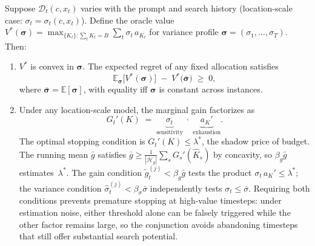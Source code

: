 \begin{proposition}
\label{prop:online}
Suppose $\mathcal{D}_t(c,x_t)$ varies with the prompt and search history
(location-scale case: $\sigma_t = \sigma_t(c,x_t)$).
Define the oracle value
$V^*(\boldsymbol{\sigma})=\max_{\{K_t\}:\sum_t K_t=B}\sum_t\sigma_t\,a_{K_t}$
for variance profile $\boldsymbol{\sigma}=(\sigma_1,\dots,\sigma_T)$.
Then:
\begin{enumerate}
\item[\textbf{(i)}]
  $V^*$ is convex in $\boldsymbol{\sigma}$.
  The expected regret of any fixed allocation satisfies
  \begin{equation}
    \mathbb{E}_{\boldsymbol{\sigma}}\!\bigl[V^*(\boldsymbol{\sigma})\bigr]
    \;-\; V^*\!\bigl(\bar{\boldsymbol{\sigma}}\bigr) \;\ge\; 0,
    \label{eq:jensen-gap}
  \end{equation}
  where $\bar{\boldsymbol{\sigma}}=\mathbb{E}[\boldsymbol{\sigma}]$,
  with equality iff $\boldsymbol{\sigma}$ is constant across instances.
\item[\textbf{(ii)}]
  Under any location-scale model, the marginal gain factorizes as
  \begin{equation}
    G_t'(K) \;=\; \underbrace{\sigma_t}_{\text{sensitivity}}
    \;\cdot\; \underbrace{a_K'}_{\text{exhaustion}}.
    \label{eq:marginal-decomp}
  \end{equation}
  The optimal stopping condition is $G_t'(K)\le\lambda^*$, the shadow
  price of budget.
  The running mean $\bar{g}$ satisfies
  $\bar{g}\ge\tfrac{1}{|\mathcal{H}_g|}\sum_s G_s'(\hat{K}_s)$
  by concavity, so $\beta_g\bar{g}$ estimates~$\lambda^*$.
  The gain condition $\widetilde{g}_t^{(j)}<\beta_g\bar{g}$ tests the
  product $\sigma_t\,a_K'\le\lambda^*$; the variance condition
  $\hat{\sigma}_t^{(j)}<\beta_\sigma\bar{\sigma}$ independently tests
  $\sigma_t\le\bar{\sigma}$.
  Requiring both conditions prevents premature stopping at
  high-value timesteps: under estimation noise, either threshold
  alone can be falsely triggered while the other factor remains
  large, so the conjunction avoids abandoning timesteps that still
  offer substantial search potential.
\end{enumerate}
\end{proposition}

